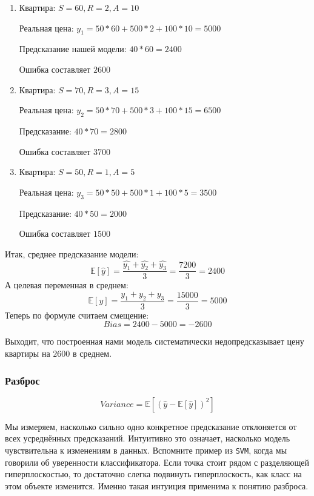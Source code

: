 \begin{enumerate}
    \item Квартира: $
    S = 60, R = 2, A = 10
    $
    
    Реальная цена: $
    y_1 = 50 * 60 + 500 * 2 + 100 * 10 = 5000
    $
    
    Предсказание нашей модели: $
    40 * 60 = 2400
    $
    
    Ошибка составляет $2600$

    \item Квартира: $
    S = 70, R = 3, A = 15
    $
    
    Реальная цена: $
    y_2 = 50 * 70 + 500 * 3 + 100 * 15 = 6500
    $
    
    Предсказание: $
    40 * 70 = 2800
    $
    
    Ошибка составляет $3700$

    \item Квартира: $
    S = 50, R = 1, A = 5
    $
    
    Реальная цена: $
    y_3 = 50*50 + 500*1 + 100*5 = 3500
    $
    
    Предсказание: $
    40 * 50 = 2000
    $
    
    Ошибка составляет $1500$
\end{enumerate}
Итак, среднее предсказание модели:
\[
\mathbb{E}[\hat{y}] = \frac{\hat{y_1} + \hat{y_2} + \hat{y_3}} {3} = 
\frac{7200}{3} = 2400
\]
А целевая переменная в среднем:
\[
\mathbb{E}[y] = \frac{y_1 + y_2 + y_3}{3} = \frac{15000}{3} = 5000
\]
Теперь по формуле считаем смещение:
\[
Bias = 2400 - 5000 = -2600
\]

Выходит, что построенная нами модель систематически недопредсказывает цену квартиры на $2600$ в среднем.

\subsubsection*{Разброс}
\[
Variance = \mathbb{E}[(\hat{y} - \mathbb{E}[\hat{y}])^2]
\]

Мы измеряем, насколько сильно одно конкретное предсказание отклоняется от всех усреднённых предсказаний. Интуитивно это означает, насколько модель чувствительна к изменениям в данных. Вспомните пример из \texttt{SVM}, когда мы говорили об уверенности классификатора. Если точка стоит рядом с разделяющей гиперплоскостью, то достаточно слегка подвинуть гиперплоскость, как класс на этом объекте изменится. Именно такая интуиция применима к понятию разброса.


